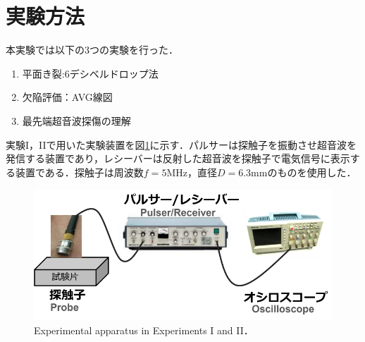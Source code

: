 \section{実験方法}
本実験では以下の3つの実験を行った．

\renewcommand{\theenumi}{\Roman{enumi}}
\begin{enumerate}
    \item 平面き裂:6デシベルドロップ法
    \item 欠陥評価：AVG線図
    \item 最先端超音波探傷の理解
\end{enumerate}

実験I，IIで用いた実験装置を図\ref{fig:実験装置}に示す．パルサーは探触子を振動させ超音波を発信する装置であり，レシーバーは反射した超音波を探触子で電気信号に表示する装置である．探触子は周波数$f = 5\mathrm{MHz}$，直径$D = 6.3\mathrm{mm}$のものを使用した．
\begin{figure}[htbp]
    \centering %
    \includegraphics[width=100truemm,clip]{fig/実験装置.png}
    \caption{Experimental apparatus in Experiments I and II．}
    \label{fig:実験装置}
\end{figure}

\renewcommand{\theenumi}{\arabic{enumi}}
